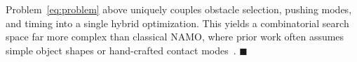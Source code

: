 \begin{remark}\label{remark:uniqueness}
  Problem~\eqref{eq:problem} above uniquely couples obstacle selection, pushing
  modes, and timing into a single hybrid optimization. This yields a
  combinatorial search space far more complex than classical NAMO, where
  prior work often assumes simple object shapes or hand-crafted contact
  modes~\cite{wang2006multi,goyal1989limit,chen2015occlusion,tang2023combinatorial}.
  \hfill $\blacksquare$
\end{remark}
